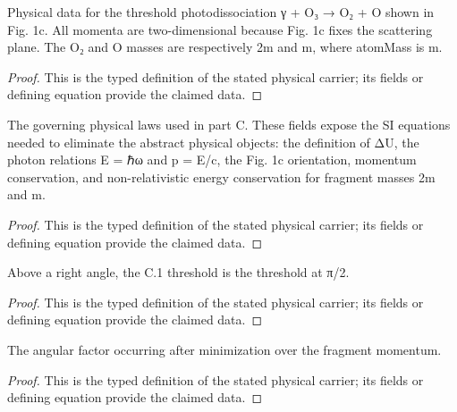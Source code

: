 \begin{definition}
  \label{def:physics:IPhO_2026_1_C_2:aux015}
  Physical data for the threshold photodissociation γ + O₃ → O₂ + O shown in Fig. 1c. All momenta are two-dimensional because Fig. 1c fixes the scattering plane. The O₂ and O masses are respectively 2m and m, where atomMass is m.
\end{definition}
\begin{proof}
  This is the typed definition of the stated physical carrier; its fields or defining equation provide the claimed data.
\end{proof}

\begin{definition}
  \label{def:physics:IPhO_2026_1_C_2:aux016}
  The governing physical laws used in part C. These fields expose the SI equations needed to eliminate the abstract physical objects: the definition of ΔU, the photon relations E = ℏω and p = E/c, the Fig. 1c orientation, momentum conservation, and non-relativistic energy conservation for fragment masses 2m and m.
\end{definition}
\begin{proof}
  This is the typed definition of the stated physical carrier; its fields or defining equation provide the claimed data.
\end{proof}

\begin{definition}
  \label{def:physics:IPhO_2026_1_C_2:aux017}
  Above a right angle, the C.1 threshold is the threshold at π/2.
\end{definition}
\begin{proof}
  This is the typed definition of the stated physical carrier; its fields or defining equation provide the claimed data.
\end{proof}

\begin{definition}
  \label{def:physics:IPhO_2026_1_C_2:aux018}
  The angular factor occurring after minimization over the fragment momentum.
\end{definition}
\begin{proof}
  This is the typed definition of the stated physical carrier; its fields or defining equation provide the claimed data.
\end{proof}

